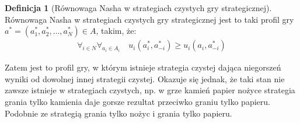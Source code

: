 \documentclass[inzynierska]{pwr_wmat_praca_dyplomowa}
\theoremstyle{plain}
\numberwithin{theorem}{chapter}
\theoremstyle{definition}
\numberwithin{theorem}{chapter}
\newtheorem{definition}[theorem]{Definicja}
\begin{document}
	\begin{definition}[Równowaga Nasha w strategiach czystych gry strategicznej]
		Równowaga Nasha w strategiach czystych gry strategicznej jest to taki profil gry $a^*= (a_1^*,a_2^*,\dots,a_N^*)\in A$, takim, że:
		\begin{align*}
			\displaystyle\mathop{\forall}_{i \in N} 
			\displaystyle\mathop{\forall}_{a_i \in A_i} \quad
			u_i(a_i^*,a_{-i}^*) \ge u_i(a_i, a_{-i}^*)
		\end{align*}
	\end{definition}
	Zatem jest to profil gry, w którym istnieje strategia czystej dająca niegorszeń  wyniki od dowolnej innej strategii czystej.
	Okazuje się jednak, że taki stan nie zawsze istnieje w strategiach czystych, np. w grze kamień papier nożyce strategia grania tylko kamienia daje gorsze rezultat przeciwko graniu tylko papieru. Podobnie ze strategią grania tylko nożyc i grania tylko papieru.
\end{document}
